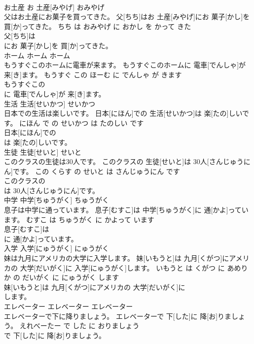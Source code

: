 \documentclass[8pt]{extreport}
\begin{document}
\begin{CJK}{UTF8}{min}
\\	お土産	お 土産[みやげ]	おみやげ	
\\	父はお土産にお菓子を買ってきた。	父[ちち]はお 土産[みやげ]にお 菓子[かし]を 買[か]ってきた。	ちち は おみやげ に おかし を かって きた	
\\	父[ちち]は
\\	にお 菓子[かし]を 買[か]ってきた。		
\\	ホーム	ホーム	ホーム	
\\	もうすぐこのホームに電車が来ます。	もうすぐこのホームに 電車[でんしゃ]が 来[き]ます。	もうすぐ この ほーむ に でんしゃ が きます	
\\	もうすぐこの
\\	に 電車[でんしゃ]が 来[き]ます。		
\\	生活	生活[せいかつ]	せいかつ	
\\	日本での生活は楽しいです。	日本[にほん]での 生活[せいかつ]は 楽[たの]しいです。	にほん で の せいかつ は たのしい です	
\\	日本[にほん]での
\\	は 楽[たの]しいです。		
\\	生徒	生徒[せいと]	せいと	
\\	このクラスの生徒は30人です。	このクラスの 生徒[せいと]は 30人[さんじゅうにん]です。	この くらす の せいと は さんじゅうにん です	
\\	このクラスの
\\	は 30人[さんじゅうにん]です。		
\\	中学	中学[ちゅうがく]	ちゅうがく	
\\	息子は中学に通っています。	息子[むすこ]は 中学[ちゅうがく]に 通[かよ]っています。	むすこ は ちゅうがく に かよって います	
\\	息子[むすこ]は
\\	に 通[かよ]っています。		
\\	入学	入学[にゅうがく]	にゅうがく	
\\	妹は九月にアメリカの大学に入学します。	妹[いもうと]は 九月[くがつ]にアメリカの 大学[だいがく]に 入学[にゅうがく]します。	いもうと は くがつ に あめりか の だいがく に にゅうがく します	
\\	妹[いもうと]は 九月[くがつ]にアメリカの 大学[だいがく]に
\\	します。		
\\	エレベーター	エレベーター	エレベーター	
\\	エレベーターで下に降りましょう。	エレベーターで 下[した]に 降[お]りましょう。	えれべーたー で した に おりましょう	
\\	で 下[した]に 降[お]りましょう。		

\end{CJK}
\end{document}
